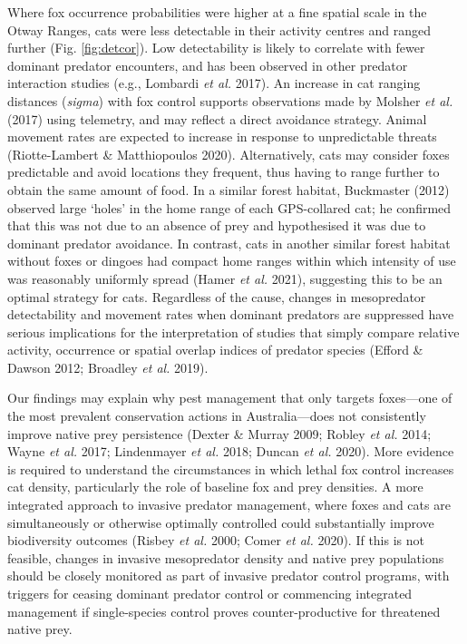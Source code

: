 \documentclass[preprint, 3p, authoryear]{elsarticle} %
\begin{document}
Where fox occurrence probabilities were higher at a fine spatial scale in the Otway Ranges, cats were less detectable in their activity centres and ranged further (Fig. \ref{fig:detcor}). Low detectability is likely to correlate with fewer dominant predator encounters, and has been observed in other predator interaction studies (e.g., Lombardi \emph{et al.} 2017). An increase in cat ranging distances (\emph{sigma}) with fox control supports observations made by Molsher \emph{et al.} (2017) using telemetry, and may reflect a direct avoidance strategy. Animal movement rates are expected to increase in response to unpredictable threats (Riotte-Lambert \& Matthiopoulos 2020). Alternatively, cats may consider foxes predictable and avoid locations they frequent, thus having to range further to obtain the same amount of food. In a similar forest habitat, Buckmaster (2012) observed large `holes' in the home range of each GPS-collared cat; he confirmed that this was not due to an absence of prey and hypothesised it was due to dominant predator avoidance. In contrast, cats in another similar forest habitat without foxes or dingoes had compact home ranges within which intensity of use was reasonably uniformly spread (Hamer \emph{et al.} 2021), suggesting this to be an optimal strategy for cats. Regardless of the cause, changes in mesopredator detectability and movement rates when dominant predators are suppressed have serious implications for the interpretation of studies that simply compare relative activity, occurrence or spatial overlap indices of predator species (Efford \& Dawson 2012; Broadley \emph{et al.} 2019).

Our findings may explain why pest management that only targets foxes---one of the most prevalent conservation actions in Australia---does not consistently improve native prey persistence (Dexter \& Murray 2009; Robley \emph{et al.} 2014; Wayne \emph{et al.} 2017; Lindenmayer \emph{et al.} 2018; Duncan \emph{et al.} 2020). More evidence is required to understand the circumstances in which lethal fox control increases cat density, particularly the role of baseline fox and prey densities. A more integrated approach to invasive predator management, where foxes and cats are simultaneously or otherwise optimally controlled could substantially improve biodiversity outcomes (Risbey \emph{et al.} 2000; Comer \emph{et al.} 2020). If this is not feasible, changes in invasive mesopredator density and native prey populations should be closely monitored as part of invasive predator control programs, with triggers for ceasing dominant predator control or commencing integrated management if single-species control proves counter-productive for threatened native prey.
\end{document}

